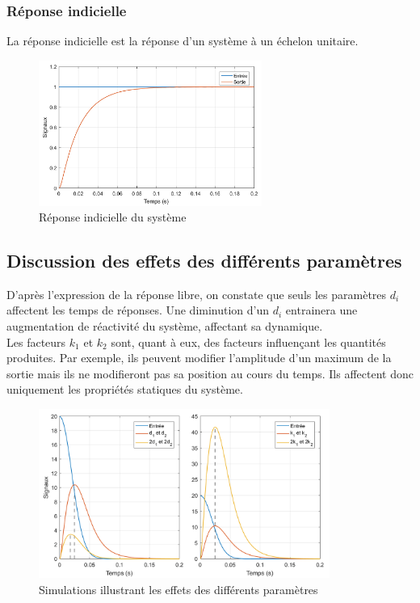 \documentclass[a4paper, 12pt]{article}
\begin{document}
	\subsubsection{Réponse indicielle}
	La réponse indicielle est la réponse d'un système à un échelon unitaire. \\

	\begin{figure}[H]
		\centering
		\includegraphics[width = 0.65\textwidth]{resources/pdf/rep_ind.pdf}
		\caption{Réponse indicielle du système}
	\end{figure}
	\subsection{Discussion des effets des différents paramètres}
	D'après l'expression de la réponse libre, on constate que seuls les paramètres ${d}_{i}$ affectent les temps de réponses. Une diminution d'un ${d}_{i}$ entrainera une augmentation de réactivité du système, affectant sa dynamique.\\
	Les facteurs ${k}_{1}$ et ${k}_{2}$ sont, quant à eux, des facteurs influençant les \og{} quantités \fg{} produites. Par exemple, ils peuvent modifier l'amplitude d'un maximum de la sortie mais ils ne modifieront pas sa position au cours du temps. Ils affectent donc uniquement les propriétés statiques du système.
	\begin{figure}[H]
		\centering
		\includegraphics[width = 0.85\textwidth]{resources/pdf/effet_param.pdf}
		\caption{Simulations illustrant les effets des différents paramètres}
	\end{figure}
\end{document}
